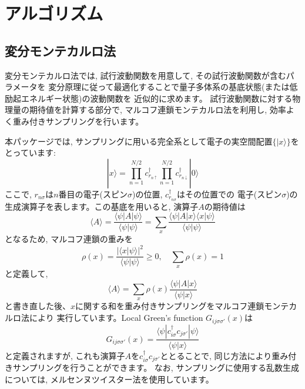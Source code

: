 \chapter{アルゴリズム}
\label{Ch:algorithm}
\section{変分モンテカルロ法}

変分モンテカルロ法では, 試行波動関数を用意して, その試行波動関数が含むパラメータを
変分原理に従って最適化することで量子多体系の基底状態(または低励起エネルギー状態)の波動関数を
近似的に求めます。
試行波動関数に対する物理量の期待値を計算する部分で, マルコフ連鎖モンテカルロ法を利用し, 
効率よく重み付きサンプリングを行います。

本パッケージでは, サンプリングに用いる完全系として電子の実空間配置$\{| x\rangle\}$をとっています:
\begin{equation}
| x\rangle =  \prod_{n=1}^{N/2} c_{r_{n\uparrow}}^{\dag} \prod_{n=1}^{N/2} c_{r_{n\downarrow}}^{\dag} |0 \rangle
\end{equation}
ここで, $r_{n\sigma}$は$n$番目の電子(スピン$\sigma$)の位置, $c_{r_{n\sigma}}^{\dag}$はその位置での
電子(スピン$\sigma$)の生成演算子を表します。この基底を用いると, 演算子$A$の期待値は
\begin{equation}
\langle A \rangle =\frac{\langle \psi| A| \psi \rangle}{\langle \psi | \psi \rangle} 
=\sum_x \frac{\langle \psi| A | x\rangle \langle x| \psi \rangle}{\langle \psi |\psi \rangle} 
\end{equation}
となるため, マルコフ連鎖の重みを
\begin{equation}
\rho(x)=\frac{|\langle x| \psi \rangle|^2}{\langle \psi | \psi \rangle} \ge 0, \quad \sum_{x} \rho(x)=1
\end{equation}
と定義して, 
\begin{equation}
\langle A \rangle =\sum_x \rho(x) \frac{\langle \psi| A | x\rangle }{\langle \psi |x \rangle} 
\end{equation}
と書き直した後、$x$に関する和を重み付きサンプリングをマルコフ連鎖モンテカルロ法により
実行しています。Local Green's function $G_{ij\sigma\sigma'}(x)$は
\begin{equation}
G_{ij\sigma\sigma'}(x)=\frac{\langle \psi | c_{i\sigma}^{\dag} c_{j\sigma'} | \psi \rangle}{\langle \psi | x \rangle}
\end{equation}
と定義されますが, これも演算子$A$を$c_{i\sigma}^{\dag} c_{j\sigma'}$ととることで, 
同じ方法により重み付きサンプリングを行うことができます。
なお, サンプリングに使用する乱数生成については, メルセンヌツイスター法を使用しています\cite{Mutsuo2008}。

